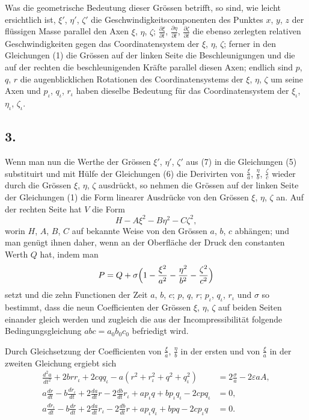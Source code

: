 \documentclass[12pt,a4paper]{article}
\begin{document}
Was die geometrische Bedeutung dieser Grössen betrifft, so sind, wie leicht ersichtlich ist, $\xi'$, $\eta'$, $\zeta'$ die Geschwindigkeitscomponenten des Punktes $x$, $y$, $z$ der flüssigen Masse parallel den Axen $\xi$, $\eta$, $\zeta$; $\frac{\partial \xi}{\partial t}$, $\frac{\partial \eta}{\partial t}$, $\frac{\partial \zeta}{\partial t}$ die ebenso zerlegten relativen Geschwindigkeiten gegen das Coordinatensystem der $\xi$, $\eta$, $\zeta$; ferner in den Gleichungen (1) die Grössen auf der linken Seite die Beschleunigungen und die auf der rechten die beschleunigenden Kräfte parallel diesen Axen; endlich sind $p$, $q$, $r$ die augenblicklichen Rotationen des Coordinatensystems der $\xi$, $\eta$, $\zeta$ um seine Axen und $p_\iota$, $q_\iota$, $r_\iota$ haben dieselbe Bedeutung für das Coordinatensystem der $\xi_\iota$, $\eta_\iota$, $\zeta_\iota$.

\subsection*{3.}

Wenn man nun die Werthe der Grössen $\xi'$, $\eta'$, $\zeta'$ aus (7) in die Gleichungen (5) substituirt und mit Hülfe der Gleichungen (6) die Derivirten von $\frac{\xi}{a}$, $\frac{\eta}{b}$, $\frac{\zeta}{c}$ wieder durch die Grössen $\xi$, $\eta$, $\zeta$ ausdrückt, so nehmen die Grössen auf der linken Seite der Gleichungen (1) die Form linearer Ausdrücke von den Grössen $\xi$, $\eta$, $\zeta$ an. Auf der rechten Seite hat $V$ die Form
\[
H - A\xi^2 - B\eta^2 - C\zeta^2,
\]
worin $H$, $A$, $B$, $C$ auf bekannte Weise von den Grössen $a$, $b$, $c$ abhängen; und man genügt ihnen daher, wenn an der Oberfläche der Druck den constanten Werth $Q$ hat, indem man
\[
P = Q + \sigma\Bigl(1 - \frac{\xi^2}{a^2} - \frac{\eta^2}{b^2} - \frac{\zeta^2}{c^2}\Bigr)
\]
setzt und die zehn Functionen der Zeit $a$, $b$, $c$; $p$, $q$, $r$; $p_\iota$, $q_\iota$, $r_\iota$ und $\sigma$ so bestimmt, dass die neun Coefficienten der Grössen $\xi$, $\eta$, $\zeta$ auf beiden Seiten einander gleich werden und zugleich die aus der Incompressibilität folgende Bedingungsgleichung $abc = a_0b_0c_0$ befriedigt wird.

\newpage

Durch Gleichsetzung der Coefficienten von $\frac{\xi}{a}$, $\frac{\eta}{b}$ in der ersten und von $\frac{\xi}{a}$ in der zweiten Gleichung ergiebt sich
\begin{align*}
\frac{d^2a}{dt^2} + 2brr_\iota + 2cqq_\iota - a(r^2 + r_\iota^2 + q^2 + q_\iota^2) &= 2\frac{\sigma}{a} - 2\varepsilon aA,\\
a\frac{dr}{dt} - b\frac{dr_\iota}{dt} + 2\frac{da}{dt}r - 2\frac{db}{dt}r_\iota + ap_\iota q + bp_\iota q_\iota - 2cpq_\iota &= 0,\\
a\frac{dr_\iota}{dt} - b\frac{dr}{dt} + 2\frac{da}{dt}r_\iota - 2\frac{db}{dt}r + ap_\iota q_\iota + bpq - 2cp_\iota q &= 0.
\end{align*}
\end{document}
